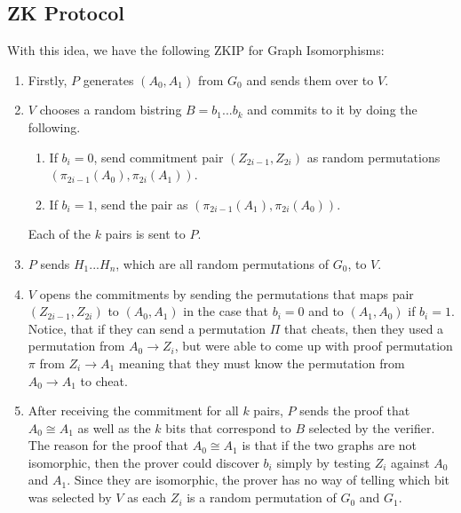 \documentclass[11pt]{article}
\begin{document}
\subsection{ZK Protocol}
With this idea, we have the following ZKIP for Graph Isomorphisms:
\begin{enumerate}
    \item Firstly, $P$ generates $(A_0,A_1)$ from $G_0$ and sends them over to $V$.
    \item $V$ chooses a random bistring $B = b_1...b_k$ and commits to it by doing the following.
    \begin{enumerate}
        \item If $b_i = 0$, send commitment pair $(Z_{2i-1},Z_{2i})$ as random permutations $(\pi_{2i-1}(A_0),\pi_{2i}(A_1))$.
        \item If $b_i = 1$, send the pair as $(\pi_{2i-1}(A_1), \pi_{2i}(A_0))$.
    \end{enumerate}
    Each of the $k$ pairs is sent to $P$.
    \item $P$ sends $H_1...H_n$, which are all random permutations of $G_0$, to $V$.
    \item $V$ opens the commitments by sending the permutations that maps pair $(Z_{2i-1},Z_{2i})$ to $(A_0,A_1)$ in the case that $b_i = 0$ and to $(A_1,A_0)$ if $b_i = 1$. Notice, that if they can send a permutation $\Pi$ that cheats, then they used a permutation from $A_0 \rightarrow Z_i$, but were able to come up with proof permutation $\pi$ from $Z_i \rightarrow A_1$ meaning that they must know the permutation from $A_0 \rightarrow A_1$ to cheat.
    \item After receiving the commitment for all $k$ pairs, $P$ sends the proof that $A_0 \cong A_1$ as well as the $k$ bits that correspond to $B$ selected by the verifier. The reason for the proof that $A_0 \cong A_1$ is that if the two graphs are not isomorphic, then the prover could discover $b_i$ simply by testing $Z_i$ against $A_0$ and $A_1$. Since they are isomorphic, the prover has no way of telling which bit was selected by $V$ as each $Z_i$ is a random permutation of $G_0$ and $G_1$. 
\end{enumerate}
\end{document}
